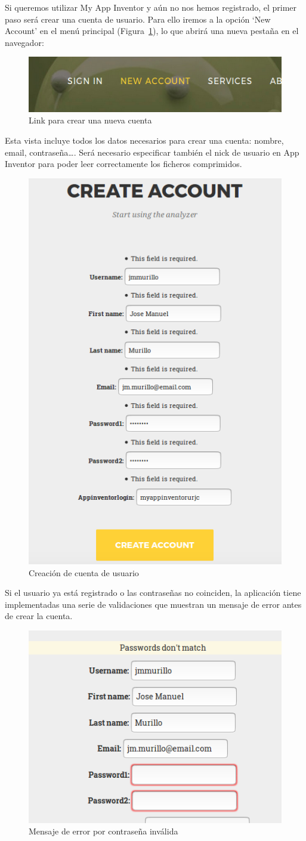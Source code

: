 \documentclass[a4paper, 12pt]{book}
\begin{document}
Si queremos utilizar My App Inventor y aún no nos hemos registrado, el primer paso será crear una cuenta de usuario. Para ello iremos a la opción `New Account' en el menú principal (Figura~\ref{fig:newAccountLink}), lo que abrirá una nueva pestaña en el navegador:
\begin{figure}[H]
  \centering
  \includegraphics[width=0.40\linewidth, keepaspectratio]{img/newAccountLink}
  \caption{Link para crear una nueva cuenta}
  \label{fig:newAccountLink}
\end{figure}
Esta vista incluye todos los datos necesarios para crear una cuenta: nombre, email, contraseña\ldots. Será necesario especificar también el nick de usuario en App Inventor para poder leer correctamente los ficheros comprimidos.  
\begin{figure}[H]
  \centering
  \includegraphics[width=0.55\linewidth, keepaspectratio]{img/createaccount}
  \caption{Creación de cuenta de usuario}
  \label{fig:createaccount}
\end{figure}
Si el usuario ya está registrado o las contraseñas no coinciden, la aplicación tiene implementadas una serie de validaciones que muestran un mensaje de error antes de crear la cuenta.
\begin{figure}[H]
  \centering
  \includegraphics[width=0.60\linewidth, keepaspectratio]{img/invalidpassword}
  \caption{Mensaje de error por contraseña inválida}
  \label{fig:invalidpassword}
\end{figure}
\end{document}
